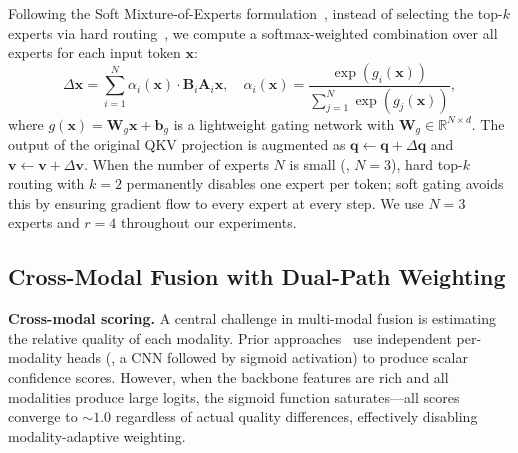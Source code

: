 Following the Soft Mixture-of-Experts formulation~\cite{puigcerver2024softmoe}, instead of selecting the top-$k$ experts via hard routing~\cite{zhu2024moe, shazeer2017moe}, we compute a softmax-weighted combination over all experts for each input token $\mathbf{x}$:
\begin{equation}
  \Delta \mathbf{x} = \sum_{i=1}^{N} \alpha_i(\mathbf{x}) \cdot \mathbf{B}_i \mathbf{A}_i \mathbf{x},
  \quad \alpha_i(\mathbf{x}) = \frac{\exp(g_i(\mathbf{x}))}{\sum_{j=1}^{N} \exp(g_j(\mathbf{x}))},
  \label{eq:soft_moe}
\end{equation}
where $g(\mathbf{x}) = \mathbf{W}_g \mathbf{x} + \mathbf{b}_g$ is a lightweight gating network with $\mathbf{W}_g \in \mathbb{R}^{N \times d}$.
The output of the original QKV projection is augmented as $\mathbf{q} \leftarrow \mathbf{q} + \Delta \mathbf{q}$ and $\mathbf{v} \leftarrow \mathbf{v} + \Delta \mathbf{v}$.
When the number of experts $N$ is small (\eg, $N{=}3$), hard top-$k$ routing with $k{=}2$ permanently disables one expert per token; soft gating avoids this by ensuring gradient flow to every expert at every step.
We use $N{=}3$ experts and $r{=}4$ throughout our experiments.


\subsection{Cross-Modal Fusion with Dual-Path Weighting}
\label{sec:cross_modal}

\noindent\textbf{Cross-modal scoring.}
A central challenge in multi-modal fusion is estimating the relative quality of each modality.
Prior approaches~\cite{chen2025memorysam} use independent per-modality heads (\eg, a CNN followed by sigmoid activation) to produce scalar confidence scores.
However, when the backbone features are rich and all modalities produce large logits, the sigmoid function saturates---all scores converge to ${\sim}1.0$ regardless of actual quality differences, effectively disabling modality-adaptive weighting.

